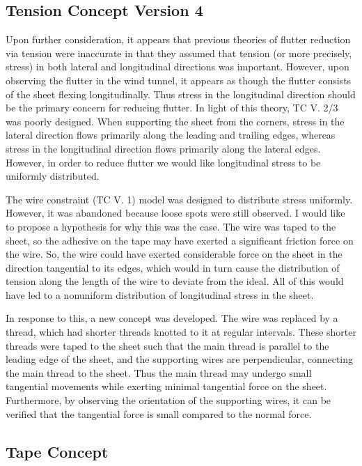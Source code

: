 \documentclass[12pt]{report} %
\begin{document}
\subsection{Tension Concept Version 4}

Upon further consideration, it appears that previous theories of flutter reduction via tension were inaccurate in that they assumed that
tension (or more precisely, stress) in both lateral and longitudinal directions was important. However, upon observing the flutter in the wind
tunnel, it appears as though the flutter consists of the sheet flexing longitudinally. Thus stress in the longitudinal direction should be the
primary concern for reducing flutter. In light of this theory, TC V. 2/3 was poorly designed. When supporting the sheet from the corners, stress
in the lateral direction flows primarily along the leading and trailing edges, whereas stress in the longitudinal direction flows primarily
along the lateral edges. However, in order to reduce flutter we would like longitudinal stress to be uniformly distributed.

The wire constraint (TC V. 1) model was designed to distribute stress uniformly. However, it was abandoned because loose spots were still
observed. I would like to propose a hypothesis for why this was the case. The wire was taped to the sheet, so the adhesive on the tape
may have exerted a significant friction force on the wire. So, the wire could have exerted considerable force on the sheet in the direction
tangential to its edges, which would in turn cause the distribution of tension along the length of the wire to deviate from the ideal. All
of this would have led to a nonuniform distribution of longitudinal stress in the sheet.

In response to this, a new concept was developed. The wire was replaced by a thread, which had shorter threads knotted to it at regular
intervals. These shorter threads were taped to the sheet such that the main thread is parallel to the leading edge of the sheet, and the
supporting wires are perpendicular, connecting the main thread to the sheet. Thus the main thread may undergo small tangential movements while
exerting minimal tangential force on the sheet. Furthermore, by observing the orientation of the supporting wires, it can be verified that
the tangential force is small compared to the normal force.

\subsection{Tape Concept}
\end{document}
